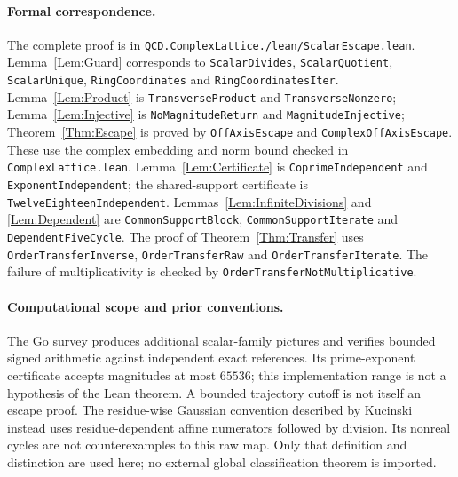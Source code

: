 \documentclass[11pt,letterpaper]{article}
\begin{document}
\paragraph{Formal correspondence.}
The complete proof is in
\texttt{QCD.\allowbreak Complex\allowbreak Lattice./\allowbreak lean/\allowbreak Scalar\allowbreak Escape.\allowbreak lean}.
Lemma~\ref{Lem:Guard} corresponds to
\texttt{Scalar\allowbreak Divides}, \texttt{Scalar\allowbreak Quotient}, \texttt{Scalar\allowbreak Unique},
\texttt{Ring\allowbreak Coordinates} and \texttt{Ring\allowbreak Coordinates\allowbreak Iter}.
Lemma~\ref{Lem:Product} is \texttt{Transverse\allowbreak Product} and
\texttt{Transverse\allowbreak Nonzero}; Lemma~\ref{Lem:Injective} is
\texttt{No\allowbreak Magnitude\allowbreak Return} and \texttt{Magnitude\allowbreak Injective};
Theorem~\ref{Thm:Escape} is proved by \texttt{Off\allowbreak Axis\allowbreak Escape} and
\texttt{Complex\allowbreak Off\allowbreak Axis\allowbreak Escape}. These use the complex embedding and
norm bound checked in \texttt{Complex\allowbreak Lattice.\allowbreak lean}.
Lemma~\ref{Lem:Certificate} is \texttt{Coprime\allowbreak Independent} and
\texttt{Exponent\allowbreak Independent}; the shared-support certificate is
\texttt{Twelve\allowbreak Eighteen\allowbreak Independent}.
Lemmas~\ref{Lem:InfiniteDivisions} and \ref{Lem:Dependent} are
\texttt{Common\allowbreak Support\allowbreak Block}, \texttt{Common\allowbreak Support\allowbreak Iterate} and
\texttt{Dependent\allowbreak Five\allowbreak Cycle}.
The proof of Theorem~\ref{Thm:Transfer} uses \texttt{Order\allowbreak Transfer\allowbreak Inverse},
\texttt{Order\allowbreak Transfer\allowbreak Raw} and \texttt{Order\allowbreak Transfer\allowbreak Iterate}.
The failure of multiplicativity is checked by
\texttt{Order\allowbreak Transfer\allowbreak Not\allowbreak Multiplicative}.

\paragraph{Computational scope and prior conventions.}
The Go survey produces additional scalar-family pictures and verifies
bounded signed arithmetic against independent exact references. Its
prime-exponent certificate accepts magnitudes at most \(65536\); this
implementation range is not a hypothesis of the Lean theorem.
A bounded trajectory cutoff is not itself an escape proof.
The residue-wise Gaussian convention described by Kucinski
\cite{Kucinski00} instead uses residue-dependent affine numerators followed
by division. Its nonreal cycles are not counterexamples to this raw map.
Only that definition and distinction are used here; no external global
classification theorem is imported.



\end{document}
